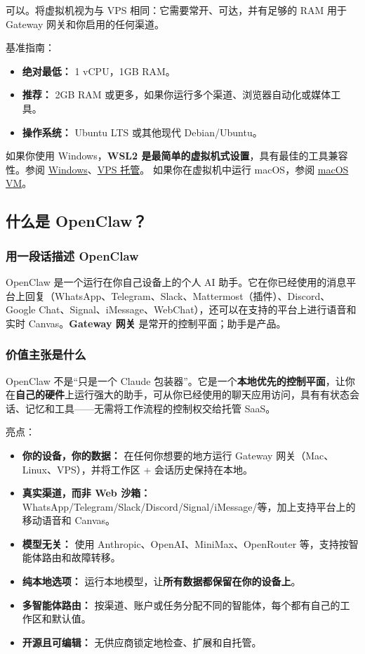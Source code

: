 可以。将虚拟机视为与 VPS 相同：它需要常开、可达，并有足够的 RAM 用于 Gateway 网关和你启用的任何渠道。

基准指南：

\begin{itemize}
  \item \textbf{绝对最低：} 1 vCPU，1GB RAM。
  \item \textbf{推荐：} 2GB RAM 或更多，如果你运行多个渠道、浏览器自动化或媒体工具。
  \item \textbf{操作系统：} Ubuntu LTS 或其他现代 Debian/Ubuntu。
\end{itemize}


如果你使用 Windows，\textbf{WSL2 是最简单的虚拟机式设置}，具有最佳的工具兼容性。参阅 \href{/platforms/windows}{Windows}、\href{/vps}{VPS 托管}。
如果你在虚拟机中运行 macOS，参阅 \href{/install/macos-vm}{macOS VM}。

\subsection{什么是 OpenClaw？}


\subsubsection{用一段话描述 OpenClaw}


OpenClaw 是一个运行在你自己设备上的个人 AI 助手。它在你已经使用的消息平台上回复（WhatsApp、Telegram、Slack、Mattermost（插件）、Discord、Google Chat、Signal、iMessage、WebChat），还可以在支持的平台上进行语音和实时 Canvas。\textbf{Gateway 网关} 是常开的控制平面；助手是产品。

\subsubsection{价值主张是什么}


OpenClaw 不是“只是一个 Claude 包装器”。它是一个\textbf{本地优先的控制平面}，让你在\textbf{自己的硬件}上运行强大的助手，可从你已经使用的聊天应用访问，具有有状态会话、记忆和工具——无需将工作流程的控制权交给托管 SaaS。

亮点：

\begin{itemize}
  \item \textbf{你的设备，你的数据：} 在任何你想要的地方运行 Gateway 网关（Mac、Linux、VPS），并将工作区 + 会话历史保持在本地。
  \item \textbf{真实渠道，而非 Web 沙箱：} WhatsApp/Telegram/Slack/Discord/Signal/iMessage/等，加上支持平台上的移动语音和 Canvas。
  \item \textbf{模型无关：} 使用 Anthropic、OpenAI、MiniMax、OpenRouter 等，支持按智能体路由和故障转移。
  \item \textbf{纯本地选项：} 运行本地模型，让\textbf{所有数据都保留在你的设备上}。
  \item \textbf{多智能体路由：} 按渠道、账户或任务分配不同的智能体，每个都有自己的工作区和默认值。
  \item \textbf{开源且可编辑：} 无供应商锁定地检查、扩展和自托管。
\end{itemize}



